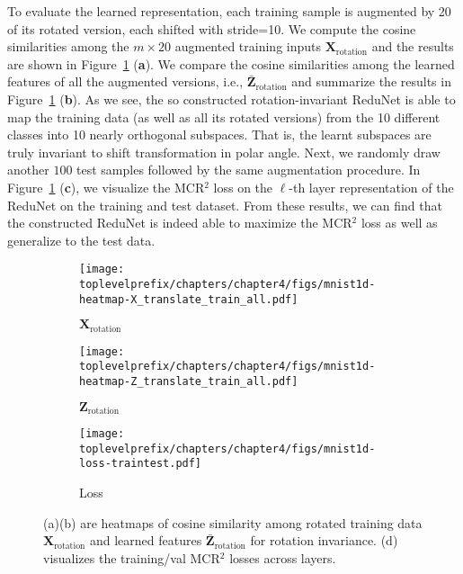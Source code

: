 \documentclass[\toplevelprefix/book-main.tex]{subfiles}
\begin{document}
\begin{example}
To evaluate the learned representation, each training sample is augmented by 20 of its rotated version, each shifted with stride=10. We compute the cosine similarities among the $m \times 20$ augmented training inputs $\bm{X}_{\text{rotation}}$ and the results are shown in Figure~\ref{fig:redu-invariant-1d-mnist-diagram} (\textbf{a}). 
We compare the cosine similarities among the learned features of all the augmented versions, i.e., $\bar{\bm{Z}}_{\text{rotation}}$ and summarize the results in  Figure~\ref{fig:redu-invariant-1d-mnist-diagram} (\textbf{b}). 
As we see, the so constructed rotation-invariant ReduNet is able to  map the training data (as well as all its rotated versions) from the 10 different classes into 10 nearly orthogonal subspaces. That is, the learnt subspaces are truly invariant to shift transformation in polar angle.  Next, we randomly draw another $100$ test samples followed by the same augmentation procedure. 
In Figure~\ref{fig:redu-invariant-1d-mnist-diagram} (\textbf{c}), we visualize the MCR$^{2}$ loss on the  $\ell$-th layer representation of the ReduNet on the training and test dataset. From these results, we can find that the constructed ReduNet is indeed able to maximize the MCR$^{2}$ loss as well as generalize to the test data.



\begin{figure}[t]
    \begin{subfigure}[t]{0.3\textwidth}
        \centering
        \texttt{[image: \\toplevelprefix/chapters/chapter4/figs/mnist1d-heatmap-X\_translate\_train\_all.pdf]}
        \caption{$\bm{X}_{\text{rotation}}$}
    \end{subfigure}
    \hfill
    \begin{subfigure}[t]{0.3\textwidth}
        \centering
        \texttt{[image: \\toplevelprefix/chapters/chapter4/figs/mnist1d-heatmap-Z\_translate\_train\_all.pdf]}
        \caption{$\bm{Z}_{\text{rotation}}$}
    \end{subfigure}
    \hfill
    \begin{subfigure}[t]{0.32\textwidth}
        \centering
        \texttt{[image: \\toplevelprefix/chapters/chapter4/figs/mnist1d-loss-traintest.pdf]}
        \caption{Loss}
    \end{subfigure}
    \caption{\small (a)(b) are heatmaps of cosine similarity among rotated training data $\bm{X}_{\text{rotation}}$ and learned features $\bar{\bm{Z}}_{\text{rotation}}$ for rotation invariance. (d) visualizes the training/val MCR$^2$ losses across layers.}
    \label{fig:redu-invariant-1d-mnist-diagram}
\end{figure}

\end{example}
\end{document}
